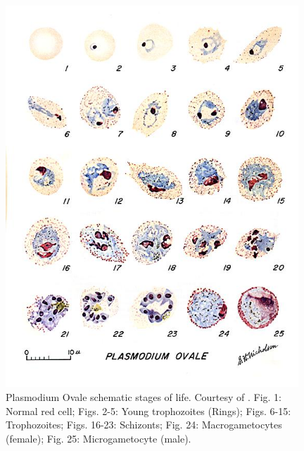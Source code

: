 \begin{figure}[!htbp]
	\centering
	\includegraphics[width=0.98\textwidth]{images/malaria_th/mal_ova}
	\caption[Plasmodium Ovale's stages of life.]{\label{fig:ova_th} Plasmodium Ovale schematic stages of life. Courtesy of \cite{Med_cdc}.
		Fig. 1: Normal red cell; Figs. 2-5: Young trophozoites (Rings); Figs. 6-15: Trophozoites; 
		Figs. 16-23: Schizonts; Fig. 24: Macrogametocytes (female); Fig. 25: Microgametocyte (male).}
\end{figure}

